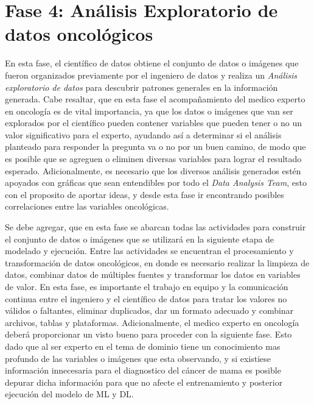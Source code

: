 \section{Fase 4: Análisis Exploratorio de datos oncológicos}

En esta fase, el científico de datos obtiene el conjunto de datos o imágenes que fueron organizados previamente por el ingeniero de datos y realiza un \textit{Análisis exploratorio de datos} para descubrir patrones generales en la información generada. Cabe resaltar, que en esta fase el acompañamiento del medico experto en oncología es de vital importancia, ya que los datos o imágenes que van ser explorados por el científico pueden contener variables que pueden tener o no un valor significativo para el experto, ayudando así a determinar si el análisis planteado para responder la pregunta va o no por un buen camino, de modo que es posible que se agreguen o eliminen diversas variables para lograr el resultado esperado. Adicionalmente, es necesario que los diversos análisis generados estén apoyados con gráficas que sean entendibles por todo el \textit{Data Analysis Team}, esto con el proposito de aportar ideas, y desde esta fase ir encontrando posibles correlaciones entre las variables oncológicas.

Se debe agregar, que en esta fase se abarcan todas las actividades para construir el conjunto de datos o imágenes que se utilizará en la siguiente etapa de modelado y ejecución. Entre las actividades se encuentran el procesamiento y transformación de datos oncológicos, en donde es necesario realizar la limpieza de datos, combinar datos de múltiples fuentes y transformar los datos en variables de valor. En esta fase, es importante el trabajo en equipo y la comunicación continua entre el ingeniero y el científico de datos para tratar los valores no válidos o faltantes, eliminar duplicados, dar un formato adecuado y combinar archivos, tablas y plataformas. Adicionalmente, el medico experto en oncología deberá proporcionar un visto bueno para proceder con la siguiente fase. Esto dado que al ser experto en el tema de dominio tiene un conocimiento mas profundo de las variables o imágenes que esta observando, y si existiese información innecesaria para el diagnostico del cáncer de mama es posible depurar dicha información para que no afecte el entrenamiento y posterior ejecución del modelo de ML y DL.

